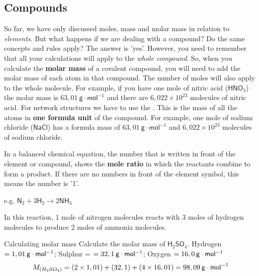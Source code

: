             \subsection*{Compounds}
            \nopagebreak
      \label{m38717*id278284}So far, we have only discussed moles, mass and molar mass in relation to \textsl{elements}. But what happens if we are dealing with a compound? Do the same concepts and rules apply? The answer is 'yes'. However, you need to remember that all your calculations will apply to the \textsl{whole compound}. So, when you calculate the \textbf{molar mass} of a covalent compound, you will need to add the molar mass of each atom in that compound. The number of moles will also apply to the whole molecule. For example, if you have one mole of nitric acid ($\mathsf{HNO}_{3}$) the molar mass is $63,01~\mathsf{g}\cdot{\mathsf{mol}}^{-1}$ and there are $6,022 \times 10^{23}$ molecules of nitric acid. For network structures we have to use the . This is the mass of all the atoms in \textbf{one formula unit} of the compound. For example, one mole of sodium chloride ($\mathsf{NaCl}$) has a formula mass of $63,01~\mathsf{g}\cdot{\mathsf{mol}}^{-1}$ and $6,022 \times 10^{23}$ molecules of sodium chloride. \par 
      \label{m38717*id278429}In a balanced chemical equation, the number that is written in front of the element or compound, shows the \textbf{mole ratio} in which the reactants combine to form a product. If there are no numbers in front of the element symbol, this means the number is '1'.\par 
      \label{m38717*id278442}e.g. ${\mathsf{N}}_{2}+3{\mathsf{H}}_{2}\to 2\mathsf{N}{\mathsf{H}}_{3}$\par 
      \label{m38717*id278488}In this reaction, 1 mole of nitrogen molecules reacts with 3 moles of hydrogen molecules to produce 2 moles of ammonia molecules.\par 
\label{m38717*secfhsst!!!underscore!!!id566}\vspace{-1cm} 
      \begin{wex}{Calculating molar mass }{
      \label{m38717*probfhsst!!!underscore!!!id567}
      \label{m38717*id278505}Calculate the molar mass of $\mathsf{H}{}_{2}\mathsf{SO}{}_{4}$.
      \vspace{5pt}}
{
      \label{m38717*id278575}Hydrogen $=1,01\phantom{\rule{2pt}{0ex}}\mathsf{g}\ensuremath{\cdot}\mathsf{mol}{}^{-1}$; Sulphur = $=32,1\phantom{\rule{2pt}{0ex}}\mathsf{g}\ensuremath{\cdot}\mathsf{mol}{}^{-1}$; Oxygen $=16,0\phantom{\rule{2pt}{0ex}}\mathsf{g}\ensuremath{\cdot}\mathsf{mol}{}^{-1}$ 
      \label{m38717*id278632}\nopagebreak\noindent{}
    \begin{equation*}
    {M}_{\left({H}_{2}S{O}_{4}\right)}=\left(2\ensuremath{\times}1,01\right)+\left(32,1\right)+\left(4\ensuremath{\times}16,01\right)=98,09\phantom{\rule{2pt}{0ex}}\mathsf{g}\ensuremath{\cdot}{\mathsf{mol}}^{-1}
      \end{equation*}
}
    \end{wex}
